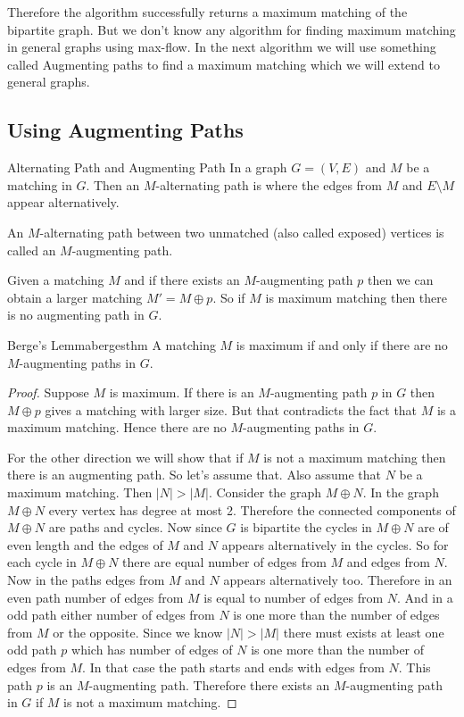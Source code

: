 Therefore the algorithm successfully returns a maximum matching of the bipartite graph. But we don't know any algorithm for finding maximum matching in general graphs using max-flow. In the next algorithm we will use something called Augmenting paths to find a maximum matching which we will extend to general graphs.
\subsection{Using Augmenting Paths}\label{section:bp-augment-path}
\begin{Definition}{Alternating Path and Augmenting Path}{}
	In a graph $G=(V,E)$ and $M$ be a matching in $G$. Then an $M$-alternating path is where the edges from $M$ and $E\setminus M$ appear alternatively.\parinn
	
	An $M$-alternating path between two unmatched (also called exposed) vertices is called an $M$-augmenting path. 
\end{Definition}

Given a matching $M$ and if there exists an $M$-augmenting path $p$ then we can obtain a larger matching $M'=M\oplus p$.  So if $M$ is maximum matching then there is no augmenting path in $G$.
\begin{Theorem}{Berge's Lemma}{bergesthm}
	A matching $M$ is maximum if and only if there are no $M$-augmenting paths in $G$.
\end{Theorem}
\begin{proof}
	Suppose $M$ is maximum. If there is an $M$-augmenting path $p$ in $G$ then $M\oplus p$  gives a matching with larger size. But that contradicts the fact that $M$ is a maximum matching. Hence there are no $M$-augmenting paths in $G$.
	
	For the other direction we will show that if $M$ is not a maximum matching then there is an augmenting path. So let's assume that. Also assume that $N$ be a maximum matching. Then $|N|>|M|$. Consider the graph $M\oplus N$. In the graph $M\oplus N$ every vertex has degree at most 2. Therefore the connected components of $M\oplus N$ are paths and cycles. Now since $G$ is bipartite the cycles in $M\oplus N$ are of even length and the edges of $M$ and $N$ appears alternatively in the cycles. So for each cycle in $M\oplus N$ there are equal number of edges from $M$ and edges from $N$. Now in the paths edges from $M$ and $N$ appears alternatively  too. Therefore in an even path number of edges from $M$ is equal to number of edges from $N$. And in a odd path either number of edges from $N$ is one more than the number of edges from $M$ or the opposite. Since we know $|N|>|M|$ there must exists at least one odd path $p$ which has number of edges of $N$ is one more than the number of edges from $M$. In that case the path starts and ends with edges from $N$. This path $p$ is an $M$-augmenting path. Therefore there exists an $M$-augmenting path in $G$ if $M$ is not a maximum matching. 
\end{proof}


